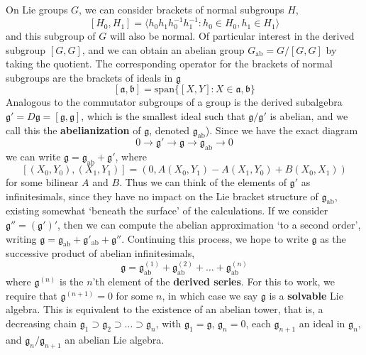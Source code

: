 On Lie groups $G$, we can consider brackets of normal subgroups $H$,
%
\[ [H_0,H_1] = \langle h_0h_1h_0^{-1}h_1^{-1} : h_0 \in H_0, h_1 \in H_1 \rangle \]
%
and this subgroup of $G$ will also be normal. Of particular interest in the derived subgroup $[G,G]$, and we can obtain an abelian group $G_{\text{ab}} = G/[G,G]$ by taking the quotient. The corresponding operator for the brackets of normal subgroups are the brackets of ideals in $\mathfrak{g}$
%
\[ [\mathfrak{a}, \mathfrak{b}] = \text{span} \{ [X,Y] : X \in \mathfrak{a}, \mathfrak{b} \} \]
%
Analogous to the commutator subgroups of a group is the derived subalgebra $\mathfrak{g}' = D\mathfrak{g} = [\mathfrak{g}, \mathfrak{g}]$, which is the smallest ideal such that $\mathfrak{g}/\mathfrak{g}'$ is abelian, and we call this the {\bf abelianization} of $\mathfrak{g}$, denoted $\mathfrak{g}_{\text{ab}}$). Since we have the exact diagram
%
\[ 0 \to \mathfrak{g}' \to \mathfrak{g} \to \mathfrak{g}_{\text{ab}} \to 0 \]
%
we can write $\mathfrak{g} = \mathfrak{g}_{\text{ab}} + \mathfrak{g}'$, where
%
\[ [(X_0,Y_0),(X_1,Y_1)] = (0, A(X_0,Y_1) - A(X_1,Y_0) + B(X_0,X_1)) \]
%
for some bilinear $A$ and $B$. Thus we can think of the elements of $\mathfrak{g}'$ as infinitesimals, since they have no impact on the Lie bracket structure of $\mathfrak{g}_{\text{ab}}$, existing somewhat `beneath the surface' of the calculations. If we consider $\mathfrak{g}'' = (\mathfrak{g}')'$, then we can compute the abelian approximation `to a second order', writing $\mathfrak{g} = \mathfrak{g}_{\text{ab}} + \mathfrak{g}'_{\text{ab}} + \mathfrak{g}''$. Continuing this process, we hope to write $\mathfrak{g}$ as the successive product of abelian infinitesimals,
%
\[ \mathfrak{g} = \mathfrak{g}^{(1)}_{\text{ab}} + \mathfrak{g}^{(2)}_{\text{ab}} + \dots + \mathfrak{g}^{(n)}_{\text{ab}} \]
%
where $\mathfrak{g}^{(n)}$ is the $n$'th element of the {\bf derived series}. For this to work, we require that $\mathfrak{g}^{(n+1)} = 0$ for some $n$, in which case we say $\mathfrak{g}$ is a {\bf solvable} Lie algebra. This is equivalent to the existence of an abelian tower, that is, a decreasing chain $\mathfrak{g}_1 \supset \mathfrak{g}_2 \supset \dots \supset \mathfrak{g}_n$, with $\mathfrak{g}_1 = \mathfrak{g}$, $\mathfrak{g}_n = 0$, each $\mathfrak{g}_{n+1}$ an ideal in $\mathfrak{g}_n$, and $\mathfrak{g}_n/\mathfrak{g}_{n+1}$ an abelian Lie algebra.

